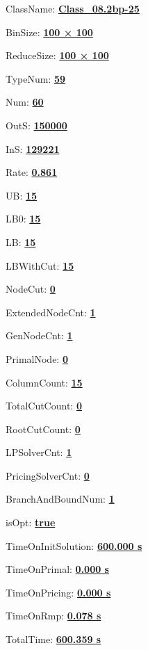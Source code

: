 \documentclass[11pt]{article}
\begin{document}
\pagestyle{empty}


ClassName: \underline{\textbf{Class_08.2bp-25}}
\par
BinSize: \underline{\textbf{100 × 100}}
\par
ReduceSize: \underline{\textbf{100 × 100}}
\par
TypeNum: \underline{\textbf{59}}
\par
Num: \underline{\textbf{60}}
\par
OutS: \underline{\textbf{150000}}
\par
InS: \underline{\textbf{129221}}
\par
Rate: \underline{\textbf{0.861}}
\par
UB: \underline{\textbf{15}}
\par
LB0: \underline{\textbf{15}}
\par
LB: \underline{\textbf{15}}
\par
LBWithCut: \underline{\textbf{15}}
\par
NodeCut: \underline{\textbf{0}}
\par
ExtendedNodeCnt: \underline{\textbf{1}}
\par
GenNodeCnt: \underline{\textbf{1}}
\par
PrimalNode: \underline{\textbf{0}}
\par
ColumnCount: \underline{\textbf{15}}
\par
TotalCutCount: \underline{\textbf{0}}
\par
RootCutCount: \underline{\textbf{0}}
\par
LPSolverCnt: \underline{\textbf{1}}
\par
PricingSolverCnt: \underline{\textbf{0}}
\par
BranchAndBoundNum: \underline{\textbf{1}}
\par
isOpt: \underline{\textbf{true}}
\par
TimeOnInitSolution: \underline{\textbf{600.000 s}}
\par
TimeOnPrimal: \underline{\textbf{0.000 s}}
\par
TimeOnPricing: \underline{\textbf{0.000 s}}
\par
TimeOnRmp: \underline{\textbf{0.078 s}}
\par
TotalTime: \underline{\textbf{600.359 s}}
\par
\newpage


\end{document}
